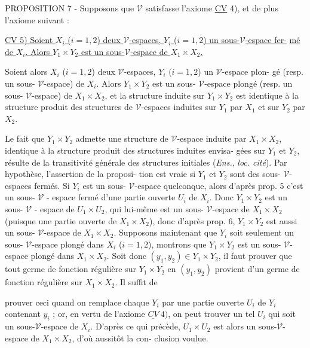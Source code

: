 PROPOSITION 7 - Supposons que $\mathcal{V}$ satisfasse l'axiome \underline{CV} 4), et de plus
l'axiome suivant :

\underline{\underline{CV} 5) Soient $X_i$ ($i=1,2$) deux $\mathcal{V}$-espaces, $Y_i$ ($i=1,2$) un sous-$\mathcal{V}$-espace fer-}
\underline{mé de $X_i$. Alors $Y_1 \times Y_2$ est un sous-$\mathcal{V}$-espace de $X_1 \times X_2$.}

Soient alors $X_i$ ($i=1,2$) deux $\mathcal{V}$-espaces, $Y_i$ ($i=1,2$) un $\mathcal{V}$-espace plon-
gé (resp. un sous- $\mathcal{V}$-espace) de $X_i$. Alors $Y_1 \times Y_2$ est un sous- $\mathcal{V}$-espace
plongé (resp. un sous- $\mathcal{V}$-espace) de $X_1 \times X_2$, et la structure induite sur
$Y_1 \times Y_2$ est identique à la structure produit des structures de $\mathcal{V}$-espaces
induites sur $Y_1$ par $X_1$ et sur $Y_2$ par $X_2$.

Le fait que $Y_1 \times Y_2$ admette une structure de $\mathcal{V}$-espace induite par
$X_1 \times X_2$, identique à la structure produit des structures induites envisa-
gées sur $Y_1$ et $Y_2$, résulte de la transitivité générale des structures
initiales (\emph{Ens.}, \emph{loc. cité}). Par hypothèse, l'assertion de la proposi-
tion est vraie si $Y_1$ et $Y_2$ sont des sous- $\mathcal{V}$-espaces fermés. Si $Y_i$ est
un sous- $\mathcal{V}$-espace quelconque, alors d'après prop. 5 c'est un sous- $\mathcal{V}$ -
espace fermé d'une partie ouverte $U_i$ de $X_i$. Donc $Y_1 \times Y_2$ est un sous- $\mathcal{V}$ -
espace de $U_1 \times U_2$, qui lui-même est un sous- $\mathcal{V}$-espace de $X_1 \times X_2$ (puisque
une partie ouverte de $X_1 \times X_2$), donc d'après prop. 6, $Y_1 \times Y_2$ est aussi un
sous- $\mathcal{V}$-espace de $X_1 \times X_2$. Supposons maintenant que $Y_i$ soit seulement
un sous- $\mathcal{V}$-espace plongé dans $X_i$ ($i=1,2$), montrons que $Y_1 \times Y_2$ est un
sous- $\mathcal{V}$-espace plongé dans $X_1 \times X_2$. Soit donc $(y_1,y_2) \in Y_1 \times Y_2$, il faut
prouver que tout germe de fonction régulière sur $Y_1 \times Y_2$ en $(y_1,y_2)$
provient d'un germe de fonction régulière sur $X_1 \times X_2$. Il suffit de

\newpage



prouver ceci quand on remplace chaque $Y_i$ par une partie ouverte $U_i$
de $Y_i$ contenant $y_i$ ; or, en vertu de l'axiome $\underline{CV}\ 4)$, on peut trouver
un tel $U_i$ qui soit un sous-$\mathcal{V}$-espace de $X_i$. D'après ce qui précède,
$U_1 \times U_2$ est alors un sous-$\mathcal{V}$-espace de $X_1 \times X_2$, d'où aussitôt la con-
clusion voulue.

